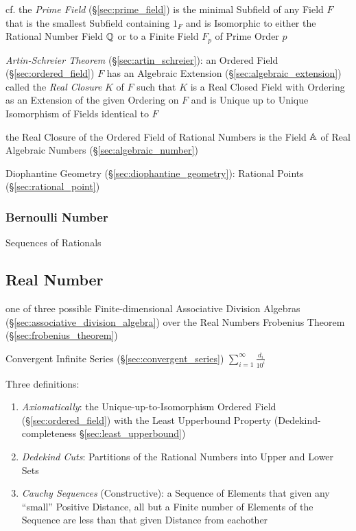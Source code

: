 \fist cf. the \emph{Prime Field} (\S\ref{sec:prime_field}) is the minimal
Subfield of any Field $F$ that is the smallest Subfield containing $1_F$ and is
Isomorphic to either the Rational Number Field $\mathbb{Q}$ or to a Finite Field
$F_p$ of Prime Order $p$

\emph{Artin-Schreier Theorem} (\S\ref{sec:artin_schreier}):
an Ordered Field (\S\ref{sec:ordered_field}) $F$ has an Algebraic Extension
(\S\ref{sec:algebraic_extension}) called the \emph{Real Closure} $K$ of $F$
such that $K$ is a Real Closed Field with Ordering as an Extension of the given
Ordering on $F$ and is Unique up to Unique Isomorphism of Fields identical to
$F$

the Real Closure of the Ordered Field of Rational Numbers is the Field
$\mathbb{A}$ of Real Algebraic Numbers (\S\ref{sec:algebraic_number})

\fist Diophantine Geometry (\S\ref{sec:diophantine_geometry}): Rational Points
(\S\ref{sec:rational_point})



\subsubsection{Bernoulli Number}\label{sec:bernoulli_number}

Sequences of Rationals




\subsection{Real Number}\label{sec:real_number}

one of three possible Finite-dimensional Associative Division Algebras
(\S\ref{sec:associative_division_algebra}) over the Real Numbers \fist
Frobenius Theorem (\S\ref{sec:frobenius_theorem})

Convergent Infinite Series (\S\ref{sec:convergent_series}) $\sum_{i =
  1}^{\infty} \frac{d_i}{10^i}$

Three definitions:
\begin{enumerate}
  \item \emph{Axiomatically}: the Unique-up-to-Isomorphism Ordered Field
    (\S\ref{sec:ordered_field}) with the Least Upperbound Property
    (Dedekind-completeness \S\ref{sec:least_upperbound})
  \item \emph{Dedekind Cuts}: Partitions of the Rational Numbers into
    Upper and Lower Sets
  \item \emph{Cauchy Sequences} (Constructive): a Sequence of Elements that
    given any ``small'' Positive Distance, all but a Finite number of Elements
    of the Sequence are less than that given Distance from eachother
\end{enumerate}

